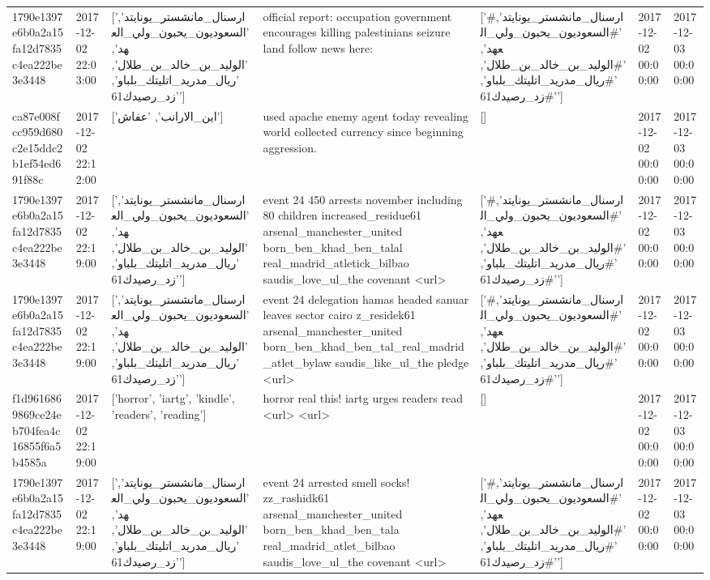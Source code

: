 \begin{tabular}{lllllll}
1790e1397e6b0a2a15fa12d7835c4ea222be3e3448 & 2017-12-02 22:03:00 & ['ارسنال_مانشستر_يونايتد', 'السعوديون_يحبون_ولي_العهد', 'الوليد_بن_خالد_بن_طلال', 'ريال_مدريد_اتليتك_بلباو', 'زد_رصيدك61'] & official report: occupation government encourages killing palestinians seizure land follow news here: & ['#ارسنال_مانشستر_يونايتد', '#السعوديون_يحبون_ولي_العهد', '#الوليد_بن_خالد_بن_طلال', '#ريال_مدريد_اتليتك_بلباو', '#زد_رصيدك61'] & 2017-12-02 00:00:00 & 2017-12-03 00:00:00 \\
ca87e008fcc959d680c2e15ddc2b1ef54ed691f88c & 2017-12-02 22:12:00 & ['اين_الارانب', 'عفاش'] & used apache enemy agent today revealing world collected currency since beginning aggression. & [] & 2017-12-02 00:00:00 & 2017-12-03 00:00:00 \\
1790e1397e6b0a2a15fa12d7835c4ea222be3e3448 & 2017-12-02 22:19:00 & ['ارسنال_مانشستر_يونايتد', 'السعوديون_يحبون_ولي_العهد', 'الوليد_بن_خالد_بن_طلال', 'ريال_مدريد_اتليتك_بلباو', 'زد_رصيدك61'] & event 24 450 arrests november including 80 children increased\_residue61 arsenal\_manchester\_united born\_ben\_khad\_ben\_talal real\_madrid\_atletick\_bilbao saudis\_love\_ul\_the covenant <url> & ['#ارسنال_مانشستر_يونايتد', '#السعوديون_يحبون_ولي_العهد', '#الوليد_بن_خالد_بن_طلال', '#ريال_مدريد_اتليتك_بلباو', '#زد_رصيدك61'] & 2017-12-02 00:00:00 & 2017-12-03 00:00:00 \\
1790e1397e6b0a2a15fa12d7835c4ea222be3e3448 & 2017-12-02 22:19:00 & ['ارسنال_مانشستر_يونايتد', 'السعوديون_يحبون_ولي_العهد', 'الوليد_بن_خالد_بن_طلال', 'ريال_مدريد_اتليتك_بلباو', 'زد_رصيدك61'] & event 24 delegation hamas headed sanuar leaves sector cairo z\_residek61 arsenal\_manchester\_united born\_ben\_khad\_ben\_tal\_real\_madrid\_atlet\_bylaw saudis\_like\_ul\_the pledge <url> & ['#ارسنال_مانشستر_يونايتد', '#السعوديون_يحبون_ولي_العهد', '#الوليد_بن_خالد_بن_طلال', '#ريال_مدريد_اتليتك_بلباو', '#زد_رصيدك61'] & 2017-12-02 00:00:00 & 2017-12-03 00:00:00 \\
f1d9616869869ce24eb704fea4c16855f6a5b4585a & 2017-12-02 22:19:00 & ['horror', 'iartg', 'kindle', 'readers', 'reading'] & horror real this! iartg urges readers read <url> <url> & [] & 2017-12-02 00:00:00 & 2017-12-03 00:00:00 \\
1790e1397e6b0a2a15fa12d7835c4ea222be3e3448 & 2017-12-02 22:19:00 & ['ارسنال_مانشستر_يونايتد', 'السعوديون_يحبون_ولي_العهد', 'الوليد_بن_خالد_بن_طلال', 'ريال_مدريد_اتليتك_بلباو', 'زد_رصيدك61'] & event 24 arrested smell socks! zz\_rashidk61 arsenal\_manchester\_united born\_ben\_khad\_ben\_tala real\_madrid\_atlet\_bilbao saudis\_love\_ul\_the covenant <url> & ['#ارسنال_مانشستر_يونايتد', '#السعوديون_يحبون_ولي_العهد', '#الوليد_بن_خالد_بن_طلال', '#ريال_مدريد_اتليتك_بلباو', '#زد_رصيدك61'] & 2017-12-02 00:00:00 & 2017-12-03 00:00:00 \\

\end{tabular}
